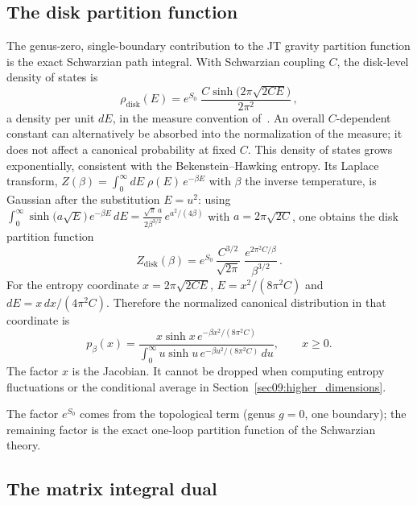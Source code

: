 \documentclass[11pt,letterpaper]{article}
\theoremstyle{plain}
\theoremstyle{definition}
\theoremstyle{remark}
\begin{document}
\subsection{The disk partition function}

The genus-zero, single-boundary contribution to the JT gravity partition
function is the exact Schwarzian path integral.  With Schwarzian coupling $C$,
the disk-level density of states is
\begin{equation}
  \rho_{\mathrm{disk}}(E) = e^{S_0}\;
  \frac{C\sinh\!\bigl(2\pi\sqrt{2CE}\bigr)}{2\pi^2}\,,
  \label{eq16:rho_disk}
\end{equation}
a density per unit $dE$, in the measure convention of~\citet{saadetal2019}.
An overall $C$-dependent constant can alternatively be absorbed into the
normalization of the measure; it does not affect a canonical probability at
fixed $C$.  This density of states grows
exponentially, consistent with the Bekenstein--Hawking entropy.  Its Laplace
transform, $Z(\beta) = \int_0^{\infty} dE\; \rho(E)\, e^{-\beta E}$ with
$\beta$ the inverse temperature, is Gaussian after the substitution
$E = u^2$: using
$\int_0^{\infty} \sinh\bigl(a\sqrt{E}\bigr)\, e^{-\beta E}\, dE
= \frac{\sqrt{\pi}\,a}{2\beta^{3/2}}\, e^{a^2/(4\beta)}$
with $a = 2\pi\sqrt{2C}$, one obtains the disk partition function
\begin{equation}
  Z_{\mathrm{disk}}(\beta)
  = e^{S_0}\,\frac{C^{3/2}}{\sqrt{2\pi}}\;
  \frac{e^{2\pi^{2}C/\beta}}{\beta^{3/2}}\,.
  \label{eq16:z_disk}
\end{equation}
For the entropy coordinate $x=2\pi\sqrt{2CE}$,
$E=x^2/(8\pi^2C)$ and $dE=x\,dx/(4\pi^2C)$.  Therefore the normalized
canonical distribution in that coordinate is
\begin{equation}
 p_\beta(x)=\frac{x\sinh x\,e^{-\beta x^2/(8\pi^2C)}}
 {\int_0^\infty u\sinh u\,e^{-\beta u^2/(8\pi^2C)}\,du},
 \qquad x\geq0.
 \label{eq16:jt_entropy_density}
\end{equation}
The factor $x$ is the Jacobian.  It cannot be dropped when computing entropy
fluctuations or the conditional average in Section~\ref{sec09:higher_dimensions}.

The factor $e^{S_0}$ comes from the topological term (genus $g=0$, one
boundary); the remaining factor is the exact one-loop partition function of
the Schwarzian theory.

\subsection{The matrix integral dual}
\end{document}
